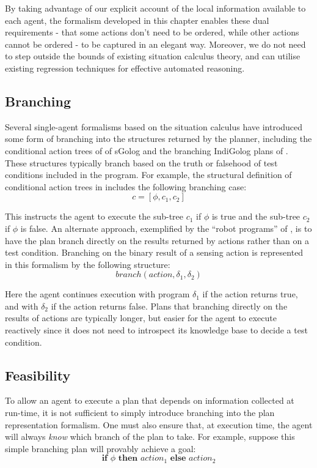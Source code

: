 By taking advantage of our explicit account of the local information
available to each agent, the formalism developed in this chapter enables
these dual requirements - that some actions don't need to be ordered,
while other actions cannot be ordered - to be captured in an elegant
way. Moreover, we do not need to step outside the bounds of existing
situation calculus theory, and can utilise existing regression techniques
for effective automated reasoning.


\subsection{Branching}

Several single-agent formalisms based on the situation calculus have
introduced some form of branching into the structures returned by
the planner, including the conditional action trees of of sGolog \citep{lakemeyer99golog_cats}
and the branching IndiGolog plans of \citep{giacomo04sem_delib_indigolog}.
These structures typically branch based on the truth or falsehood
of test conditions included in the program. For example, the structural
definition of conditional action trees in \citep{lakemeyer99golog_cats}
includes the following branching case:\[
c=[\phi,c_{1},c_{2}]\]


This instructs the agent to execute the sub-tree $c_{1}$ if $\phi$
is true and the sub-tree $c_{2}$ if $\phi$ is false. An alternate
approach, exemplified by the {}``robot programs'' of \citet{levesque98what_robots_can_do},
is to have the plan branch directly on the results returned by actions
rather than on a test condition. Branching on the binary result of
a sensing action is represented in this formalism by the following
structure:\[
branch(action,\delta_{1},\delta_{2})\]


Here the agent continues execution with program $\delta_{1}$ if the
action returns true, and with $\delta_{2}$ if the action returns
false. Plans that branching directly on the results of actions are
typically longer, but easier for the agent to execute reactively since
it does not need to introspect its knowledge base to decide a test
condition.


\subsection{Feasibility\label{sec:JointExec:BG:Feasibility}}

To allow an agent to execute a plan that depends on information collected
at run-time, it is not sufficient to simply introduce branching into
the plan representation formalism. One must also ensure that, at execution
time, the agent will always \emph{know} which branch of the plan to
take. For example, suppose this simple branching plan will provably
achieve a goal:\[
\mathbf{if}\,\,\phi\,\,\mathbf{then}\,\, action_{1}\,\,\mathbf{else\,}\, action_{2}\]


